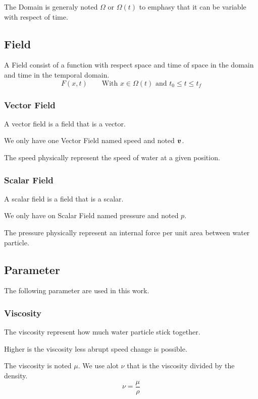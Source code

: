 The Domain is generaly noted $\Omega$ or $\Omega(t)$ to emphasy that it can be variable with respect of time.

\subsection{Field}

A Field consist of a function with respect space and time of space in the domain and time in the temporal domain.
\begin{equation}
 F(x,t)\qquad \text{With $x\in\Omega(t)$ and $t_0\leq t \leq t_f$}
\end{equation}

\subsubsection{Vector Field}
A vector field is a field that is a vector.

We only have one Vector Field named speed and noted ${\boldsymbol {v}}$.

The speed physically represent the speed of water at a given position.
\subsubsection{Scalar Field}
A scalar field is a field that is a scalar.

We only have on Scalar Field named pressure and noted $p$.

The pressure physically represent an internal force per unit area between water particle.

\subsection{Parameter}

The following parameter are used in this work.

\subsubsection{Viscosity}
The viscosity represent how much water particle stick together.

Higher is the viscosity less abrupt speed change is possible.

The viscosity is noted $\mu$. We use alot $\nu$ that is the viscosity divided by the density.
\begin{equation}
 \nu=\frac{\mu}{\rho}
\end{equation}

